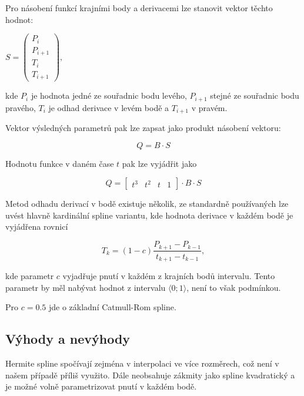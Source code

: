 \documentclass[]{thesiskiv}
\begin{document}
Pro násobení funkcí krajními body a derivacemi lze stanovit vektor těchto hodnot:

\begin{center}
\begin{math}
S = 
 \begin{pmatrix}
  P_i \\
  P_{i+1} \\
  T_i \\
  T_{i+1}
 \end{pmatrix},
\end{math}
\end{center}

kde $P_i$ je hodnota jedné ze souřadnic bodu levého, $P_{i+1}$ stejné ze souřadnic bodu pravého, $T_i$ je odhad derivace v levém bodě a $T_{i+1}$ v pravém.

Vektor výsledných parametrů pak lze zapsat jako produkt násobení vektoru:

\begin{equation}
Q = B \cdot S
\end{equation}

Hodnotu funkce v daném čase $t$ pak lze vyjádřit jako

\begin{equation}
Q = \begin{bmatrix}
  t^3 & t^2 & t & 1
 \end{bmatrix} \cdot B \cdot S
\end{equation}

Metod odhadu derivací v bodě existuje několik, ze standardně používaných lze uvést hlavně kardinální spline variantu, kde hodnota derivace v každém bodě je vyjádřena rovnicí

\begin{equation}
T_k = (1 - c)\frac{P_{k+1} - P_{k-1}}{t_{k+1} - t_{k-1}},
\end{equation}

kde parametr $c$ vyjadřuje pnutí v každém z krajních bodů intervalu. Tento parametr by měl nabývat hodnot z intervalu $\langle0 ; 1 \rangle$, není to však podmínkou.

Pro $c = 0.5$ jde o základní Catmull-Rom spline.

\subsection*{Výhody a nevýhody}

Hermite spline spočívají zejména v interpolaci ve více rozměrech, což není v našem případě příliš využito. Dále neobsahuje zákmity jako spline kvadratický a je možné volně parametrizovat pnutí v každém bodě.
\end{document}

